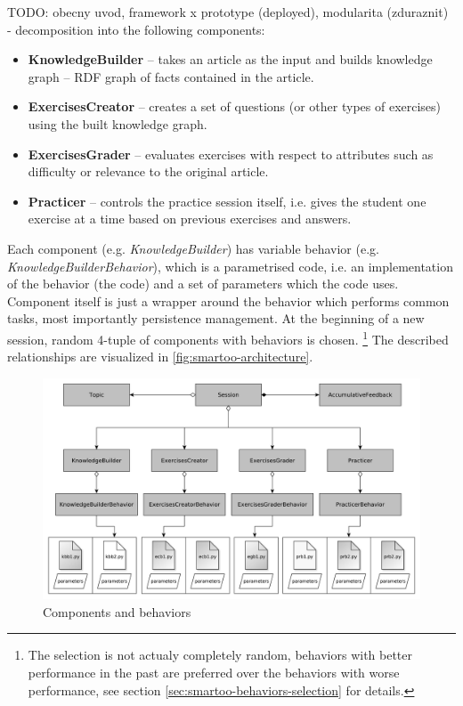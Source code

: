 \documentclass[a4paper, 12pt, twoside]{fithesis2}		%
\renewcommand{\_}{\leavevmode \kern0.0em\vbox{\hrule width0.4em}}
\newcommand{\squarebullet}{\textcolor{black}{\raisebox{0.15em}{\rule{4pt}{4pt}}}}
\newenvironment{myItemize}{
  \begin{itemize}[leftmargin=2em,rightmargin=1em,itemsep=\parskip ,parsep=0em,topsep=0em,partopsep=0em]
  \renewcommand{\labelitemi}{\squarebullet}
  \renewcommand{\labelitemii}{$\diamond$}
}{
  \end{itemize}
}
\begin{document}
TODO: obecny uvod, framework x prototype (deployed), modularita (zduraznit) - decomposition into the following components:
\begin{myItemize}
\item \textbf{KnowledgeBuilder} -- takes an article as the input and builds knowledge graph -- RDF graph of facts contained in the article.
\item \textbf{ExercisesCreator} -- creates a set of questions (or other types of exercises) using the built knowledge graph.
\item \textbf{ExercisesGrader} -- evaluates exercises with respect to attributes such as difficulty or relevance to the original article.
\item \textbf{Practicer} -- controls the practice session itself, i.e. gives the student one exercise at a time based on previous exercises and answers.
\end{myItemize}
Each component (e.g. \textit{KnowledgeBuilder}) has variable behavior (e.g. \textit{KnowledgeBuilderBehavior}), which is a parametrised code, i.e. an implementation of the behavior (the code) and a set of parameters which the code uses.
Component itself is just a wrapper around the behavior which performs common tasks, most importantly persistence management.
At the beginning of a new session, random 4-tuple of components with behaviors is chosen.%
\footnote{The selection is not actualy completely random, behaviors with better performance in the past are preferred over the behaviors with worse performance, see section \autoref{sec:smartoo-behaviors-selection} for details.} The described relationships are visualized in \autoref{fig:smartoo-architecture}.


\begin{figure}[h]
  \centering
  \includegraphics[width=\textwidth]{images/architecture.pdf}
  \caption{Components and behaviors}
  \label{fig:smartoo-architecture}
\end{figure}
\end{document}
